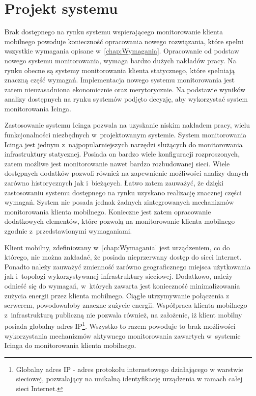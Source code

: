 \chapter{Projekt systemu}
\label{chap:ProjektSystemu}

Brak dostępnego na rynku systemu wspierającego monitorowanie klienta
mobilnego powoduje konieczność opracowania nowego rozwiązania, które
spełni wszystkie wymagania opisane w~\ref{chap:Wymagania}. Opracowanie
od podstaw nowego systemu monitorowania, wymaga bardzo dużych nakładów
pracy. Na rynku obecne są systemy monitorowania klienta statycznego,
które spełniają znaczną część wymagań. Implementacja nowego systemu
monitorowania jest zatem nieuzasadniona ekonomicznie oraz
merytorycznie. Na podstawie wyników analizy dostępnych na rynku
systemów podjęto decyzję, aby wykorzystać system monitorowania Icinga.

Zastosowanie systemu Icinga pozwala na uzyskanie niskim nakładem
pracy, wielu funkcjonalności niezbędnych w~projektowanym
systemie. System monitorowania Icinga jest jednym
z~najpopularniejszych narzędzi służących do monitorowania
infrastruktury statycznej. Posiada on bardzo wiele konfiguracji
rozproszonych, zatem możliwe jest monitorowanie nawet bardzo
rozbudowanej sieci. Wiele dostępnych dodatków pozwoli również na
zapewnienie możliwości analizy danych zarówno historycznych jak
i~bieżących. Łatwo zatem zauważyć, że dzięki zastosowaniu systemu
dostępnego na rynku uzyskano realizację znacznej części
wymagań. System nie posada jednak żadnych zintegrowanych mechanizmów
monitorowania klienta mobilnego. Konieczne jest zatem opracowanie
dodatkowych elementów, które pozwolą na monitorowanie klienta
mobilnego zgodnie z~przedstawionymi wymaganiami.

Klient mobilny, zdefiniowany w~\ref{chap:Wymagania} jest urządzeniem,
co do którego, nie można zakładać, że posiada nieprzerwany dostęp do
sieci internet. Ponadto należy zauważyć zmienność zarówno
geograficznego miejsca użytkowania jak i~topologi wykorzystywanej
infrastruktury sieciowej. Dodatkowo, należy odnieść się do wymagań,
w~których zawarta jest konieczność minimalizowania zużycia energii
przez klienta mobilnego. Ciągłe utrzymywanie połączenia z serwerem,
powodowałoby znaczne zużycie energii. Współpraca klienta mobilnego
z~infrastrukturą publiczną nie pozwala również, na założenie, iż
klient mobilny posiada globalny adres IP\footnote{Globalny adres IP -
  adres protokołu internetowego działającego w warstwie sieciowej,
  pozwalający na unikalną identyfikację urządzenia w ramach całej
  sieci Internet.}. Wszystko to razem powoduje to brak możliwości
wykorzystania mechanizmów aktywnego monitorowania zawartych w~systemie
Icinga do monitorowania klienta mobilnego.

